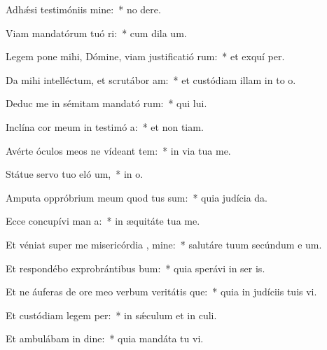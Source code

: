 \item Adhǽsi testimóniis  mine:~* no  dere.
\item Viam mandatórum tuó ri:~* cum dila  um.
\item Legem pone mihi, Dómine, viam justificatió rum:~* et exquí  per.
\item Da mihi intelléctum, et scrutábor  am:~* et custódiam illam in to  o.
\item Deduc me in sémitam mandató rum:~* qui  lui.
\item Inclína cor meum in testimó a:~* et non  tiam.
\item Avérte óculos meos ne vídeant tem:~* in via tua  me.
\item Státue servo tuo eló um,~* in  o.
\item Amputa oppróbrium meum quod tus sum:~* quia judícia  da.
\item Ecce concupívi man a:~* in æquitáte tua  me.
\item Et véniat super me misericórdia , mine:~* salutáre tuum secúndum e um.
\item Et respondébo exprobrántibus  bum:~* quia sperávi in ser is.
\item Et ne áuferas de ore meo verbum veritátis que:~* quia in judíciis tuis vi.
\item Et custódiam legem  per:~* in sǽculum et in  culi.
\item Et ambulábam in dine:~* quia mandáta tu vi.
